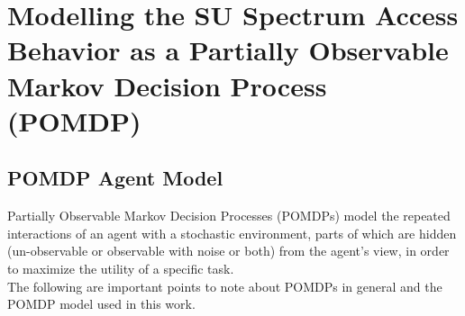 \documentclass[12pt, draftcls, onecolumn]{IEEEtran}
\begin{document}
\section{Modelling the SU Spectrum Access Behavior as a Partially Observable Markov Decision Process (POMDP)}
\subsection{POMDP Agent Model}
Partially Observable Markov Decision Processes (POMDPs) model the repeated interactions of an agent with a stochastic environment, parts of which are hidden (un-observable or observable with noise or both) from the agent's view, in order to maximize the utility of a specific task.
\\The following are important points to note about POMDPs in general and the POMDP model used in this work.
\end{document}
